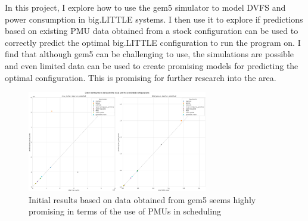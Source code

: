 In this project, I explore how to use the gem5 simulator to model DVFS and 
power consumption in big.LITTLE systems. I then use it to explore if 
predictions based on existing PMU data obtained from a stock configuration can 
be used to correctly predict the optimal big.LITTLE configuration to run the 
program on. I find that although gem5 can be challenging to use, the simulations
are possible and even limited data can be used to create promising models for 
predicting the optimal configuration. This is promising for further research 
into the area.
\begin{figure}[H]
    \centering
    \includegraphics[width=0.7\textwidth]{result-plots/stock-2b2L/system-scatter.png}
    \caption{Initial results based on data obtained from gem5 seems highly
             promising in terms of the use of PMUs in scheduling}
\end{figure}
